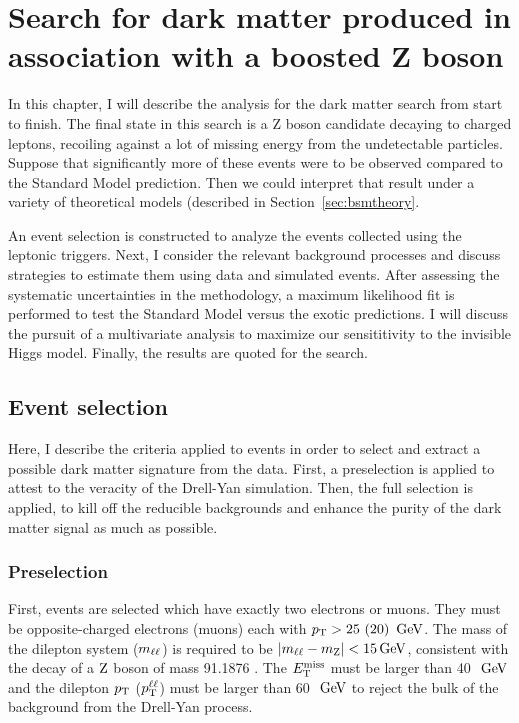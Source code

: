 \chapter{Search for dark matter produced in association with a boosted Z boson}
\label{chap:zlldm}

In this chapter, I will describe the analysis for the dark matter search from start to finish.
The final state in this search is a Z boson candidate decaying to charged leptons, recoiling against a lot of missing energy from the undetectable particles.
Suppose that significantly more of these events were to be observed compared to the Standard Model prediction.
Then we could interpret that result under a variety of theoretical models (described in Section~\ref{sec:bsmtheory}.

An event selection is constructed to analyze the events collected using the leptonic triggers.
Next, I consider the relevant background processes and discuss strategies to estimate them using data and simulated events.
After assessing the systematic uncertainties in the methodology, a maximum likelihood fit is performed to test the Standard Model versus the exotic predictions.
I will discuss the pursuit of a multivariate analysis to maximize our sensititivity to the invisible Higgs model.
Finally, the results are quoted for the search.

\section{Event selection}
\label{sec:zlldmsel}
Here, I describe the criteria applied to events in order to select and extract a possible dark matter signature from the data.
First, a preselection is applied to attest to the veracity of the Drell-Yan simulation.
Then, the full selection is applied, to kill off the reducible backgrounds and enhance the purity of the dark matter signal as much as possible.

\subsection{Preselection}
\label{ss:zlldmpresel}
First, events are selected which have exactly two electrons or muons.
They must be opposite-charged electrons (muons) each with $p_{\mathrm{T}} > 25~(20)~\,\text{Ge\hspace{-.08em}V}$.
The mass of the dilepton system ($m_{\ell\ell}$) is required to be $\left|m_{\ell\ell}-m_{\mathrm{Z}}\right| < 15\,\text{Ge\hspace{-.08em}V}$, consistent with the decay of a $\mathrm{Z}$ boson of mass 91.1876 \GeV.
The $E_\mathrm{T}^{\mathrm{miss}}$ must be larger than 40~$\,\text{Ge\hspace{-.08em}V}$ and the dilepton 
$p_{\mathrm{T}}$ ($p_{\mathrm{T}}^{\ell\ell}$) must be larger than 60~$\,\text{Ge\hspace{-.08em}V}$ to reject the bulk of the background from the Drell-Yan process.

